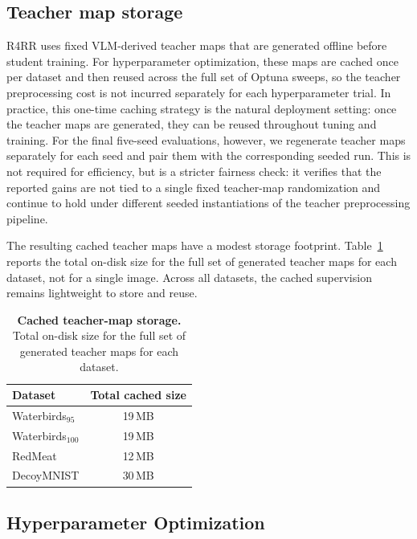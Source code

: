 \documentclass[10pt,twocolumn,letterpaper]{article}
\begin{document}
\subsection{Teacher map storage}
\label{appendix:teacher_map_cost}

R4RR uses fixed VLM-derived teacher maps that are generated offline before student training. For hyperparameter optimization, these maps are cached once per dataset and then reused across the full set of Optuna sweeps, so the teacher preprocessing cost is not incurred separately for each hyperparameter trial. In practice, this one-time caching strategy is the natural deployment setting: once the teacher maps are generated, they can be reused throughout tuning and training. For the final five-seed evaluations, however, we regenerate teacher maps separately for each seed and pair them with the corresponding seeded run. This is not required for efficiency, but is a stricter fairness check: it verifies that the reported gains are not tied to a single fixed teacher-map randomization and continue to hold under different seeded instantiations of the teacher preprocessing pipeline.

The resulting cached teacher maps have a modest storage footprint. Table~\ref{tab:teacher_map_cost} reports the total on-disk size for the full set of generated teacher maps for each dataset, not for a single image. Across all datasets, the cached supervision remains lightweight to store and reuse.

\begin{table}[h]
\centering
\caption{\textbf{Cached teacher-map storage.} Total on-disk size for the full set of generated teacher maps for each dataset.}
\label{tab:teacher_map_cost}
\small
\setlength{\tabcolsep}{8pt}
\renewcommand{\arraystretch}{1.1}
\begin{tabular}{lc}
\toprule
\textbf{Dataset} & \textbf{Total cached size} \\
\midrule
Waterbirds$_{95}$  & 19\,MB \\
Waterbirds$_{100}$ & 19\,MB \\
RedMeat            & 12\,MB \\
DecoyMNIST         & 30\,MB \\
\bottomrule
\end{tabular}
\end{table}





\subsection{Hyperparameter Optimization}
\label{sec:hparam_opt}
\end{document}
